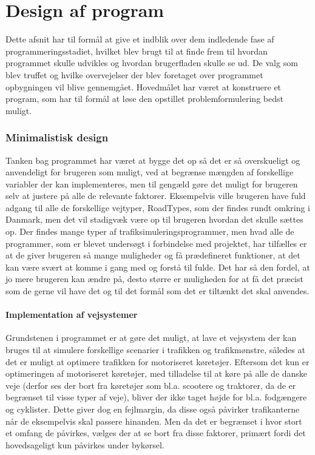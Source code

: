\chapter{Design af program}
Dette afsnit har til formål at give et indblik over dem indledende fase af programmeringsstadiet, hvilket blev brugt til at finde frem til hvordan programmet skulle udvikles og hvordan brugerfladen skulle se ud. De valg som blev truffet og hvilke overvejelser der blev foretaget over programmet opbygningen vil blive gennemgået. Hovedmålet har været at konstruere et program, som har til formål at løse den opstillet problemformulering bedst muligt. 

\subsection{Minimalistisk design}
Tanken bag programmet har været at bygge det op så det er så overskueligt og anvendeligt for brugeren som muligt, ved at begrænse mængden af forskellige variabler der kan implementeres, men til gengæld gøre det muligt for brugeren selv at justere på alle de relevante faktorer. Eksempelvis ville brugeren have fuld adgang til alle de forskellige vejtyper, RoadTypes, som der findes rundt omkring i Danmark, men det vil stadigvæk være op til brugeren hvordan det skulle sættes op. Der findes mange typer af trafiksimuleringsprogrammer, men hvad alle de programmer, som er blevet undersøgt i forbindelse med projektet, har tilfælles er at de giver brugeren så mange muligheder og få prædefineret funktioner, at det kan være svært at komme i gang med og forstå til fulde. Det har så den fordel, at jo mere brugeren kan ændre på, desto større er muligheden for at få det præcist som de gerne vil have det og til det formål som det er tiltænkt det skal anvendes.

\subsubsection{Implementation af vejsystemer}
Grundstenen i programmet er at gøre det muligt, at lave et vejsystem der kan bruges til at simulere forskellige scenarier i trafikken og trafikmønstre, således at det er muligt at optimere trafikken for motoriseret køretøjer. Eftersom det kun er optimeringen af motoriseret køretøjer, med tilladelse til at køre på alle de danske veje (derfor ses der bort fra køretøjer som bl.a. scootere og traktorer, da de er begrænset til visse typer af veje), bliver der ikke taget højde for bl.a. fodgængere og cyklister. Dette giver dog en fejlmargin, da disse også påvirker trafikanterne når de eksempelvis skal passere hinanden. Men da det er begrænset i hvor stort et omfang de påvirkes, vælges der at se bort fra disse faktorer, primært fordi det hovedsageligt kun påvirkes under bykørsel. 


